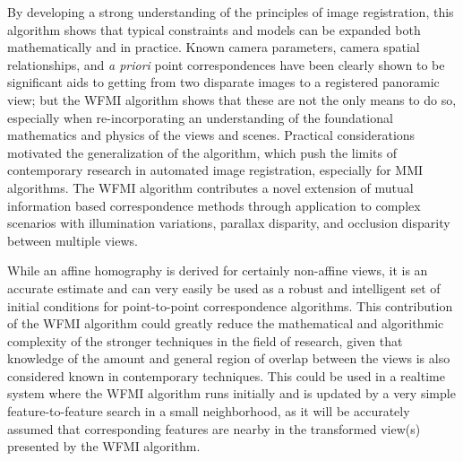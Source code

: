 By developing a strong understanding of the principles of image registration, this algorithm shows that typical constraints and models can be expanded both mathematically and in practice. Known camera parameters, camera spatial relationships, and \textit{a priori} point correspondences have been clearly shown to be significant aids to getting from two disparate images to a registered panoramic view; but the WFMI algorithm shows that these are not the only means to do so, especially when re-incorporating an understanding of the foundational mathematics and physics of the views and scenes. Practical considerations motivated the generalization of the algorithm, which push the limits of contemporary research in automated image registration, especially for MMI algorithms. The WFMI algorithm contributes a novel extension of mutual information based correspondence methods through application to complex scenarios with illumination variations, parallax disparity, and occlusion disparity between multiple views.

While an affine homography is derived for certainly non-affine views, it is an accurate estimate and can very easily be used as a robust and intelligent set of initial conditions for point-to-point correspondence algorithms. This contribution of the WFMI algorithm could greatly reduce the mathematical and algorithmic complexity of the stronger techniques in the field of research, given that knowledge of the amount and general region of overlap between the views is also considered known in contemporary techniques. This could be used in a realtime system where the WFMI algorithm runs initially and is updated by a very simple feature-to-feature search in a small neighborhood, as it will be accurately assumed that corresponding features are nearby in the transformed view(s) presented by the WFMI algorithm.



